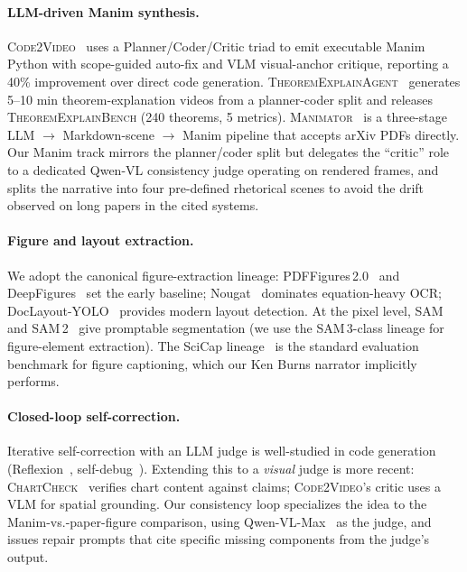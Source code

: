 \documentclass[11pt,a4paper]{article}
\begin{document}
\paragraph{LLM-driven Manim synthesis.}
\textsc{Code2Video}~\citep{hu2025code2video} uses a Planner/Coder/Critic triad to emit executable Manim Python with scope-guided auto-fix and VLM visual-anchor critique, reporting a 40\% improvement over direct code generation. \textsc{TheoremExplainAgent}~\citep{tigerai2025theoremexplainagent} generates 5--10 min theorem-explanation videos from a planner-coder split and releases \textsc{TheoremExplainBench} (240 theorems, 5 metrics). \textsc{Manimator}~\citep{hypercluster2025manimator} is a three-stage LLM $\to$ Markdown-scene $\to$ Manim pipeline that accepts arXiv PDFs directly. Our Manim track mirrors the planner/coder split but delegates the ``critic'' role to a dedicated Qwen-VL consistency judge operating on rendered frames, and splits the narrative into four pre-defined rhetorical scenes to avoid the drift observed on long papers in the cited systems.

\paragraph{Figure and layout extraction.}
We adopt the canonical figure-extraction lineage: PDFFigures\,2.0~\citep{clark2016pdffigures} and DeepFigures~\citep{siegel2018deepfigures} set the early baseline; Nougat~\citep{blecher2023nougat} dominates equation-heavy OCR; DocLayout-YOLO~\citep{zhao2024doclayoutyolo} provides modern layout detection. At the pixel level, SAM~\citep{kirillov2023sam} and SAM\,2~\citep{ravi2024sam2} give promptable segmentation (we use the SAM\,3-class lineage for figure-element extraction). The SciCap lineage~\citep{hsu2021scicap} is the standard evaluation benchmark for figure captioning, which our Ken Burns narrator implicitly performs.

\paragraph{Closed-loop self-correction.}
Iterative self-correction with an LLM judge is well-studied in code generation (Reflexion~\citep{shinn2023reflexion}, self-debug~\citep{chen2023selfdebug}). Extending this to a \emph{visual} judge is more recent: \textsc{ChartCheck}~\citep{akhtar2024chartcheck} verifies chart content against claims; \textsc{Code2Video}'s critic uses a VLM for spatial grounding. Our consistency loop specializes the idea to the Manim-vs.-paper-figure comparison, using Qwen-VL-Max~\citep{bai2023qwenvl} as the judge, and issues repair prompts that cite specific missing components from the judge's output.
\end{document}

